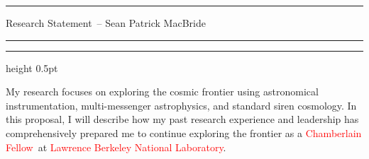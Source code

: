\documentclass[11pt]{article}
\newcommand{\tcolor}{red}
\newcommand{\yourname}{Sean Patrick MacBride}
\newcommand{\soptitle}{Research Statement}
\newcommand{\Institute}{\textcolor{\tcolor}{Lawrence Berkeley National Laboratory}}
\newcommand{\Position}{\textcolor{\tcolor}{Chamberlain Fellow}}
\begin{document}
\hrule
\begin{center}
    \Large\soptitle\ -- \yourname
\end{center}
\vspace{0pt}
\hrule
\vspace{0.5pt}
\hrule height 0.5pt
\vspace{3pt}

\normalsize
\noindent My research focuses on exploring the cosmic frontier using astronomical instrumentation, multi-messenger astrophysics, and standard siren cosmology.
In this proposal, I will describe how my past research experience and leadership has comprehensively prepared me to continue exploring the frontier as a \Position\ at \Institute.

  
\end{document}
